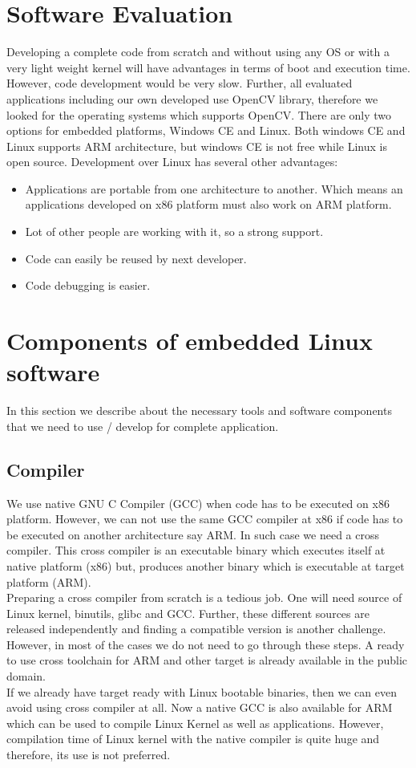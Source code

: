 \section {Software Evaluation}
\indent Developing a complete code from scratch and without using any OS
or with a very light weight kernel will have advantages in terms of boot
and execution time. However, code development would be very slow. Further,
all evaluated applications including our own developed use
OpenCV library, therefore we looked for the operating systems which
supports OpenCV. There are only two options for embedded platforms,
Windows CE and Linux. Both windows CE and Linux supports ARM
architecture, but windows CE is not free while Linux is open source.
Development over Linux has several other advantages:
\begin{itemize}
 \item Applications are portable from one architecture to
 another. Which means an applications developed on x86
 platform must also work on ARM platform.
 \item Lot of other people are working with it, so a strong
 support.
 \item Code can easily be reused by next developer.
 \item Code debugging is easier.
\end{itemize}
\section {Components of embedded Linux software}
In this section we describe about the necessary tools and software
components that we need to use / develop for complete application.
\subsection {Compiler}
\indent We use native GNU C Compiler (GCC) when code has to be executed
on x86 platform. However, we can not use the same GCC compiler at x86 if
code has to be executed on another architecture say ARM. In such case we
need a cross compiler. This cross compiler is an executable binary which
executes itself at native platform (x86) but, produces another
binary which is executable at target platform (ARM).\\
\indent Preparing a cross compiler from scratch is a tedious job. One
will need source of Linux kernel, binutils, glibc and GCC. Further,
these different sources are released independently and finding a
compatible version is another challenge. However, in most of the cases
we do not need to go through these steps. A ready to use cross toolchain
for ARM and other target is already available in the public domain.\\
\indent If we already have target ready with Linux bootable binaries,
then we can even avoid using cross compiler at all. Now a native GCC is
also available for ARM which can be used to compile Linux Kernel as well
as applications. However, compilation time of Linux kernel with the
native compiler is quite huge and therefore, its use is not preferred.
